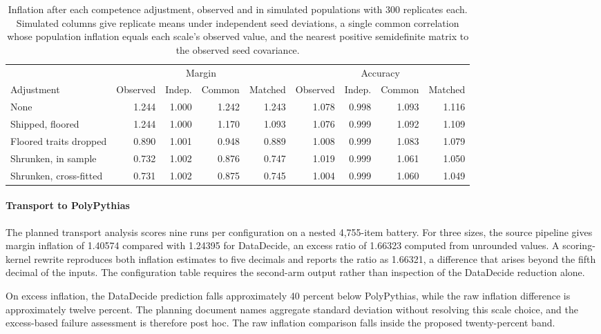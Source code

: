 \begin{table}[h]
\centering
\small
\caption{Inflation after each competence adjustment, observed and in simulated populations with 300 replicates each. Simulated columns give replicate means under independent seed deviations, a single common correlation whose population inflation equals each scale's observed value, and the nearest positive semidefinite matrix to the observed seed covariance.}
\label{tab:proxy}
\setlength{\tabcolsep}{3pt}
\begin{tabular}{lrrrrrrrr}
\toprule
& \multicolumn{4}{c}{Margin} & \multicolumn{4}{c}{Accuracy} \\
\cmidrule(lr){2-5}\cmidrule(lr){6-9}
Adjustment & Observed & Indep. & Common & Matched & Observed & Indep. & Common & Matched \\
\midrule
None & 1.244 & 1.000 & 1.242 & 1.243 & 1.078 & 0.998 & 1.093 & 1.116 \\
Shipped, floored & 1.244 & 1.000 & 1.170 & 1.093 & 1.076 & 0.999 & 1.092 & 1.109 \\
Floored traits dropped & 0.890 & 1.001 & 0.948 & 0.889 & 1.008 & 0.999 & 1.083 & 1.079 \\
Shrunken, in sample & 0.732 & 1.002 & 0.876 & 0.747 & 1.019 & 0.999 & 1.061 & 1.050 \\
Shrunken, cross-fitted & 0.731 & 1.002 & 0.875 & 0.745 & 1.004 & 0.999 & 1.060 & 1.049 \\
\bottomrule
\end{tabular}
\end{table}


\paragraph{Transport to PolyPythias}
The planned transport analysis scores nine runs per configuration on a nested 4,755-item battery. For three sizes, the source pipeline gives margin inflation of 1.40574 compared with 1.24395 for DataDecide, an excess ratio of 1.66323 computed from unrounded values. A scoring-kernel rewrite reproduces both inflation estimates to five decimals and reports the ratio as 1.66321, a difference that arises beyond the fifth decimal of the inputs. The configuration table requires the second-arm output rather than inspection of the DataDecide reduction alone.

On excess inflation, the DataDecide prediction falls approximately 40 percent below PolyPythias, while the raw inflation difference is approximately twelve percent. The planning document names aggregate standard deviation without resolving this scale choice, and the excess-based failure assessment is therefore post hoc. The raw inflation comparison falls inside the proposed twenty-percent band.

